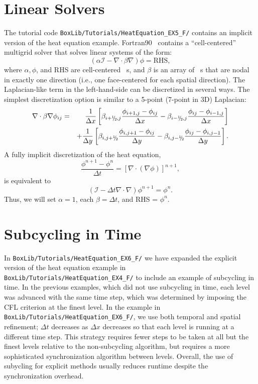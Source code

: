 \section{Linear Solvers}\label{Sec:Linear Solvers}
The tutorial code {\tt BoxLib/Tutorials/HeatEquation\_EX5\_F/}
contains an implicit version of the heat equation example.  Fortran90
\BoxLib\ contains a ``cell-centered'' multigrid solver that solves
linear systems of the form:
\begin{equation}
(\alpha\mathcal{I} - \nabla\cdot\beta\nabla)\phi = \text{RHS},
\end{equation}
where $\alpha, \phi$, and RHS are cell-centered \MultiFab~s, and
$\beta$ is an array of \MultiFab~s that are nodal in exactly one
direction (i.e., one face-centered \MultiFab for each spatial
direction).  The Laplacian-like term in the left-hand-side can be
discretized in several ways.  The simplest discretization option is
similar to a 5-point (7-point in 3D) Laplacian:
\begin{eqnarray}
\nabla\cdot\beta\nabla\phi_{ij} &=&
\frac{1}{\Delta x} \left[\beta_{i+\myhalf,j}\frac{\phi_{i+1,j} - \phi_{ij}}{\Delta x} - \beta_{i-\myhalf,j}\frac{\phi_{ij} - \phi_{i-1,j}}{\Delta x}\right]\nonumber\\
&&+ \frac{1}{\Delta y} \left[\beta_{i,j+\myhalf}\frac{\phi_{i,j+1} - \phi_{ij}}{\Delta y} - \beta_{i,j-\myhalf}\frac{\phi_{ij} - \phi_{i,j-1}}{\Delta y}\right].
\end{eqnarray}
A fully implicit discretization of the heat equation,
\begin{equation}
\frac{\phi^{n+1} - \phi^n}{\Delta t} = \left[\nabla\cdot(\nabla\phi)\right]^{n+1},
\end{equation}
is equivalent to
\begin{equation}
(\mathcal{I} - \Delta t\nabla\cdot\nabla)\phi^{n+1} = \phi^n.
\end{equation}
Thus, we will set $\alpha=1$, each $\beta=\Delta t$, and RHS = $\phi^n$.

\section{Subcycling in Time}\label{Sec:Subcycling}
In {\tt BoxLib/Tutorials/HeatEquation\_EX6\_F/} we have expanded the
explicit version of the heat equation example in {\tt
  BoxLib/Tutorials/HeatEquation\_EX4\_F/} to include an example of
subcycling in time.  In the previous examples, which did not use
subcycling in time, each level was advanced with the same time step,
which was determined by imposing the CFL criterion at the finest
level.  In the example in {\tt
  BoxLib/Tutorials/HeatEquation\_EX6\_F/}, we use both temporal and
spatial refinement; $\Delta t$ decreases as $\Delta x$ decreases so
that each level is running at a different time step.  This strategy
requires fewer steps to be taken at all but the finest levels relative
to the non-subcycling algorithm, but requires a more sophisticated
synchronization algorithm between levels.  Overall, the use of
subycling for explicit methods usually reduces runtime despite the
synchronization overhead.

